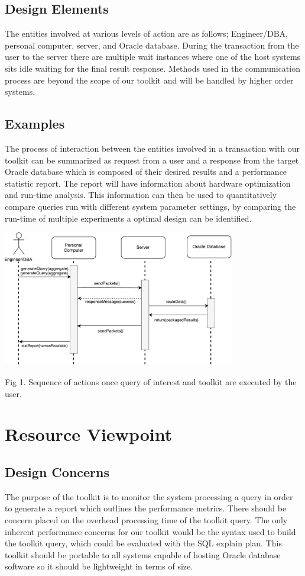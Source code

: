 \documentclass[draftclsnofoot, onecolumn, compsoc, 10pt]{IEEEtran}
\begin{document}
\subsection{Design Elements}
The entities involved at various levels of action are as follows; Engineer/DBA, personal computer, server, and Oracle database.
During the transaction from the user to the server there are multiple wait instances where one of the host systems sits idle waiting for the final result response.
Methods used in the communication process are beyond the scope of our toolkit and will be handled by higher order systems.

\subsection{Examples}
The process of interaction between the entities involved in a transaction with our toolkit can be summarized as request from a user and a response from the target Oracle database which is composed of their desired results and a performance statistic report.
The report will have information about hardware optimization and run-time analysis.
This information can then be used to quantitatively compare queries run with different system parameter settings, by comparing the run-time of multiple experiments a optimal design can be identified. 



\begin{center}
	\includegraphics[width=4in]{Sequence_Diagram.pdf}

	Fig 1. Sequence of actions once query of interest and toolkit are executed by the user.
\end{center}


\section{Resource Viewpoint}
\subsection{Design Concerns}
The purpose of the toolkit is to monitor the system processing a query in order to generate a report which outlines the performance metrics.
There should be concern placed on the overhead processing time of the toolkit query.
The only inherent performance concerns for our toolkit would be the syntax used to build the toolkit query, which could be evaluated with the SQL explain plan. This toolkit should be portable to all systems capable of hosting Oracle database software so it should be lightweight in terms of size. 
\end{document}
